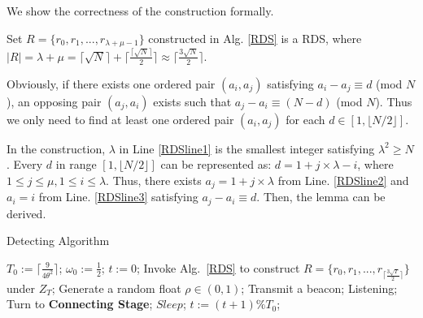 We show the correctness of the construction formally.
\begin{lemma}
\label{RDS1}
Set $R = \{r_0, r_1, ..., r_{\lambda + \mu - 1}\}$ constructed in Alg. \ref{RDS} is a RDS,
where $|R| = \lambda + \mu = \lceil \sqrt{N}  \rceil + \lceil \frac{\lceil \sqrt{N} \rceil}{2} \rceil
\approx \lceil \frac{3\sqrt{N}}{2}  \rceil$.
\end{lemma}
\begin{IEEEproof}
Obviously, if there exists one ordered pair $(a_i,a_j)$ satisfying  $a_i - a_j \equiv d$ (mod $N$),
an opposing pair $(a_j,a_i)$ exists such that
$a_j - a_i \equiv (N-d)$ (mod $N$). Thus we only need to find
at least one ordered pair $(a_i,a_j)$ for each $d \in [1, \lfloor N/2 \rfloor]$.

In the construction, $\lambda$ in Line \ref{RDSline1} is the smallest integer satisfying
$\lambda^2 \geq N$. Every $d$ in range $[1, \lfloor N/2 \rfloor]$
can be represented as: $ d = 1 + j \times \lambda - i$, where $1 \leq j \leq \mu,
1 \leq i \leq \lambda$. Thus, there exists $a_j = 1 + j \times \lambda$
from Line. \ref{RDSline2} and $a_i = i$ from Line. \ref{RDSline3}
satisfying  $a_j - a_i \equiv d$. Then, the lemma can be derived.
\end{IEEEproof}

\begin{algorithm}[!h]
    \caption{Detecting Algorithm}
    \label{DA}
    \begin{algorithmic}[1]
    \STATE $T_0 := \lceil \frac{9}{4\theta^{2}} \rceil$; $\omega_0 :=\frac{1}{2}$; $t := 0$;
    \STATE Invoke Alg.~\ref{RDS} to construct $R = \{r_0, r_1, ...,r_{\lceil 
    \frac{3\sqrt{T}}{2}  \rceil}\}$ under $Z_T$;
                \STATE Generate a random float $\rho \in (0,1)$;
                    \STATE Transmit a beacon;
                \ELSE
                    \STATE Listening;
                        \STATE Turn to \textbf{Connecting Stage};
                    \ENDIF
                \ENDIF
        \ELSE
                \STATE $Sleep$;
        \ENDIF
        \STATE $t := (t + 1) \% T_0$;
    \ENDWHILE
    \end{algorithmic}
\end{algorithm}

